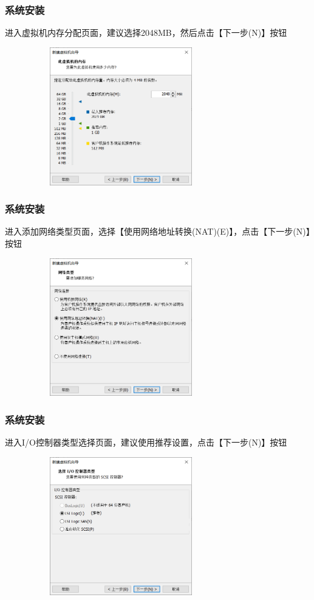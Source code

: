 \documentclass[notheorems,serif]{beamer}
\begin{document}
\begin{frame}
\frametitle{系统安装}
进入虚拟机内存分配页面，建议选择2048MB，然后点击【下一步(N)】按钮
\begin{figure}
 \centering
 \includegraphics[width=8cm,height=6cm]{./figures/图片15.png}
\end{figure}
\end{frame}

\begin{frame}
\frametitle{系统安装}
进入添加网络类型页面，选择【使用网络地址转换(NAT)(E)】，点击【下一步(N)】按钮
\begin{figure}
 \centering
 \includegraphics[width=8cm,height=6cm]{./figures/图片16.png}
\end{figure}
\end{frame}


\begin{frame}
\frametitle{系统安装}
进入I/O控制器类型选择页面，建议使用推荐设置，点击【下一步(N)】按钮
\begin{figure}
\centering
\includegraphics[width=8cm,height=6cm]{./figures/图片17.png}
\end{figure}
\end{frame}
\end{document}
